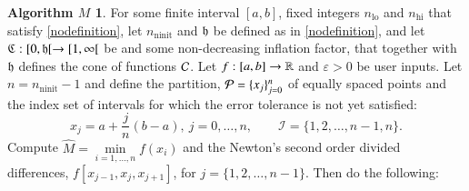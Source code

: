 \documentclass[review]{elsarticle}
\newcommand{\abstol}{\varepsilon}
\theoremstyle{definition}
\newtheorem*{algoM}{Algorithm $M$}
\newcommand{\hM}{\widehat{M}}
\DeclareMathOperator{\lo}{lo}
\DeclareMathOperator{\ninit}{ninit}
\newcommand{\minfi}{\min\limits_{i=1, \ldots,  n} f(x_i)} %
\begin{document}
\begin{algoM} \label{AlgoM}
	For some finite interval $[a,b]$,  fixed integers $n_{\lo}$ and $n_{\text{hi}}$ that satisfy \eqref{nodefinition}, let $n_{\ninit}$ and $\mathfrak{h}$ be defined as in \eqref{nodefinition}, and let  $\mathfrak{C}:[0,\mathfrak{h}[ \to [1, \infty[$ be and some non-decreasing inflation factor, that together with $\mathfrak{h}$ defines the cone of functions $\mathcal{C}$.  Let $f:[a,b] \to \mathbb{R}$ and $\abstol >0$ be
	user inputs.  Let  $n=n_{\ninit}-1$ and define the partition, $\mathcal{P} = \{x_j\}_{j=0}^n$ of  equally spaced points and the index set of intervals for which the error tolerance
	is not yet satisfied:
	$$x_j=a+\frac{j}{n}(b-a), \ j=0,\ldots,n, \qquad
	\mathcal{I} = \{1,2,\ldots,n-1,n\}.$$
	Compute $\hM= \minfi$ and the Newton's second order divided differences, $f[x_{j-1},
	x_{j}, x_{j+1}]$, for $j = \{1,2,\ldots,n-1\}$. Then do the
	following:
	

\end{algoM}
\end{document}
